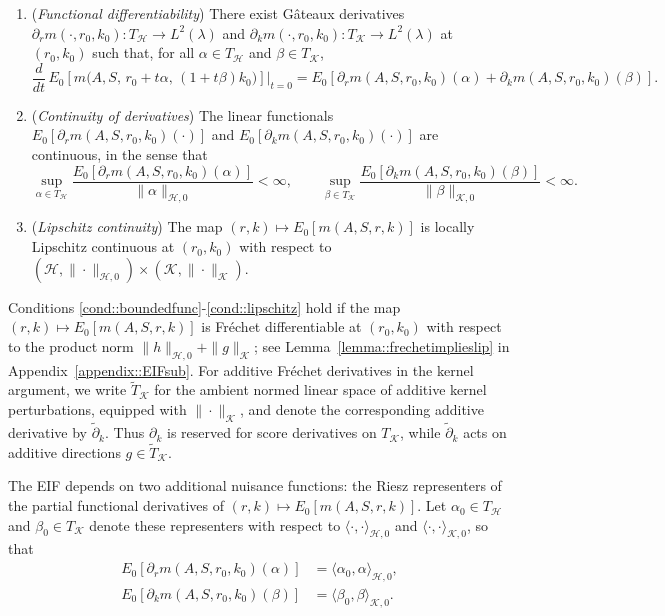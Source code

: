 \documentclass[12pt]{article}
\newcommand{\addTK}{\widetilde T_{\mathcal K}}
\newcommand{\adk}{\widetilde{\partial}_k}
\theoremstyle{plain}
\begin{document}
\begin{enumerate}[label=\textbf{(C\arabic*)}, ref=C\arabic*, series=cond]
\item (\textit{Functional differentiability}) \label{cond::boundedfunc} 
There exist Gâteaux derivatives
$\partial_r m(\cdot, r_0, k_0) : T_{\mathcal{H}} \to L^2(\lambda)$ 
and $\partial_k m(\cdot, r_0, k_0) : T_{\mathcal{K}} \to L^2(\lambda)$
at $(r_0, k_0)$ such that, for all $\alpha \in T_{\mathcal{H}}$ and $\beta \in T_{\mathcal{K}}$,
\[
   \frac{d}{dt}\, E_0\!\left[m\big(A,S,\, r_0 + t \alpha,\,(1+t\beta)k_0\big)\right]\Big|_{t=0}
   = E_0\!\left[\partial_r m(A,S,r_0,k_0)(\alpha) 
   + \partial_k m(A,S,r_0,k_0)(\beta)\right].
\]

\item (\textit{Continuity of derivatives}) \label{cond::boundedfunc2}
The linear functionals $E_0[\partial_r m(A,S,r_0,k_0)(\cdot)]$ and $E_0[\partial_k m(A,S,r_0,k_0)(\cdot)]$
are continuous, in the sense that
\[
\sup_{\alpha \in T_{\mathcal{H}}}
\frac{E_0[\partial_r m(A,S,r_0,k_0)(\alpha)]}{\|\alpha\|_{\mathcal{H}, 0}}
< \infty,
\qquad
\sup_{\beta \in T_{\mathcal{K}}}
\frac{E_0[\partial_k m(A,S,r_0,k_0)(\beta)]}{\|\beta\|_{\mathcal{K}, 0}}
< \infty.
\]
\item (\textit{Lipschitz continuity}) \label{cond::lipschitz} The map $(r,k) \mapsto E_0[m(A,S,r,k)]$ is locally Lipschitz continuous at $(r_0,k_0)$ with respect to $(\mathcal{H}, \|\cdot\|_{\mathcal{H}, 0}) \times (\mathcal{K}, \|\cdot\|_{\mathcal{K}})$.
\end{enumerate}
Conditions \ref{cond::boundedfunc}-\ref{cond::lipschitz} hold if the map
\((r,k)\mapsto E_0[m(A,S,r,k)]\) is Fréchet differentiable at \((r_0,k_0)\)
with respect to the product norm
\(\|h\|_{\mathcal{H},0} + \|g\|_{\mathcal{K}}\); see
Lemma~\ref{lemma::frechetimplieslip} in Appendix~\ref{appendix::EIFsub}.
For additive Fréchet derivatives in the kernel argument, we write
\(\addTK\) for the ambient normed linear space of additive kernel perturbations,
equipped with \(\|\cdot\|_{\mathcal K}\), and denote the corresponding
additive derivative by \(\adk\). Thus \(\partial_k\) is reserved for score
derivatives on \(T_{\mathcal K}\), while \(\adk\) acts on additive directions
\(g \in \addTK\).



 

The EIF depends on two additional nuisance functions: the Riesz representers of
the partial functional derivatives of \((r,k)\mapsto E_0[m(A,S,r,k)]\). Let
\(\alpha_0\in T_{\mathcal H}\) and \(\beta_0\in T_{\mathcal K}\) denote these
representers with respect to \(\langle\cdot,\cdot\rangle_{\mathcal H,0}\) and
\(\langle\cdot,\cdot\rangle_{\mathcal K,0}\), so that
\begin{align}
E_0[\partial_r m(A,S,r_0,k_0)(\alpha)]
&= \langle \alpha_0, \alpha \rangle_{\mathcal{H}, 0}, 
\label{eqn::rieszreward}
\\[1ex] 
E_0[\partial_k m(A,S,r_0,k_0)(\beta)]
&= \langle \beta_0, \beta \rangle_{\mathcal{K}, 0}.
\label{eqn::rieszkernel}
\end{align}
 
\end{document}
